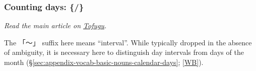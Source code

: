 \documentclass[../nihongo-gakushuu-kyouzai.tex]{subfiles}
\begin{document}
\subsubsection{Counting days: \{/\}} \label{sec:appendix-vocab-basic-nouns-counting-days}
\emph{Read the main article on \href{https://www.tofugu.com/japanese/japanese-counter-ka-nichi/}{Tofugu}.}

The 「〜」 suffix here means ``interval''. While typically dropped in the absence of ambiguity, it is necessary here to distinguish day intervals from days of the month (\S\ref{sec:appendix-vocab-basic-nouns-calendar-days}; \href{https://en.wikibooks.org/wiki/Japanese/Lessons/Days\#Periods\_of\_days}{[WB]}).

\end{document}
